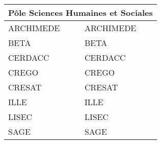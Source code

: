 
\begin{tabularx}{\linewidth}{lX}
	\toprule
	\multicolumn{2}{c}{Pôle Sciences Humaines et Sociales}\\
	\midrule
	\acrshort{ARCHIMEDE} & \acrlong{ARCHIMEDE}\\
	\acrshort{BETA} & \acrlong{BETA}\\
	\acrshort{CERDACC} & \acrlong{CERDACC}\\
	\acrshort{CREGO} & \acrlong{CREGO}\\
	\acrshort{CRESAT} & \acrlong{CRESAT}\\
	\acrshort{ILLE} & \acrlong{ILLE}\\
	\acrshort{LISEC} & \acrlong{LISEC}\\
	\acrshort{SAGE} & \acrlong{SAGE}\\
	\bottomrule
\end{tabularx}
